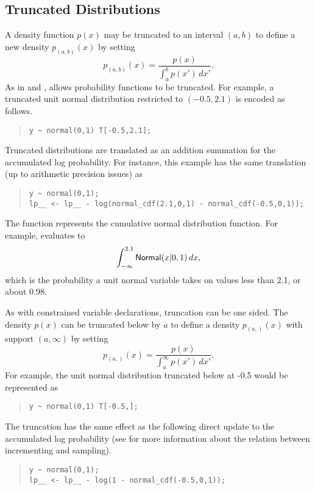 \subsection{Truncated Distributions}

A density function $p(x)$ may be truncated to an interval $(a,b)$ to
define a new density $p_{(a,b)}(x)$ by setting
%
\[ 
p_{\!(a,b)\!}(x) = \frac{p(x)}
                  {\int_a^b p(x') \, dx'}.
\] 
As in \BUGS and \JAGS, \Stan allows probability functions to be
truncated.  For example, a truncated unit normal distribution
restricted to $(-0.5,2.1)$ is encoded as follows.
%
\begin{quote}
\begin{Verbatim}[fontsize=\small]
y ~ normal(0,1) T[-0.5,2.1];
\end{Verbatim}
\end{quote}
% 
Truncated distributions are translated as an addition summation for
the accumulated log probability.  For instance, this example has the
same translation (up to arithmetic precision issues) as
%
\begin{quote}
\begin{Verbatim}[fontsize=\small]
y ~ normal(0,1);
lp__ <- lp__ - log(normal_cdf(2.1,0,1) - normal_cdf(-0.5,0,1));
\end{Verbatim}
\end{quote}
%
The function  represents the cumulative normal
distribution function.  For example,  evaluates to 
\[
\int_{-\infty}^{2.1} \mbox{\sf Normal}(x|0,1) \, dx,
\]
%
which is the probability a unit normal variable takes on values less
than 2.1, or about 0.98.

As with constrained variable declarations, truncation can be one
sided.  The density $p(x)$ can be truncated below by $a$ to define a
density $p_{(a,)}(x)$ with support $(a,\infty)$ by setting
%
\[
p_{(a,)}(x) = \frac{p(x)}
                 {\int_a^{\infty} p(x') \, dx'}.
\]
For example, the unit normal distribution truncated below at -0.5 would
be represented as
%
\begin{quote}
\begin{Verbatim} 
y ~ normal(0,1) T[-0.5,];
\end{Verbatim}
\end{quote}
% 
The truncation has the same effect as the following direct update to
the accumulated log probability (see  for
more information about the relation between incrementing 
and sampling).
%
\begin{quote}
\begin{Verbatim}[fontsize=\small]
y ~ normal(0,1);
lp__ <- lp__ - log(1 - normal_cdf(-0.5,0,1));
\end{Verbatim}
\end{quote}

